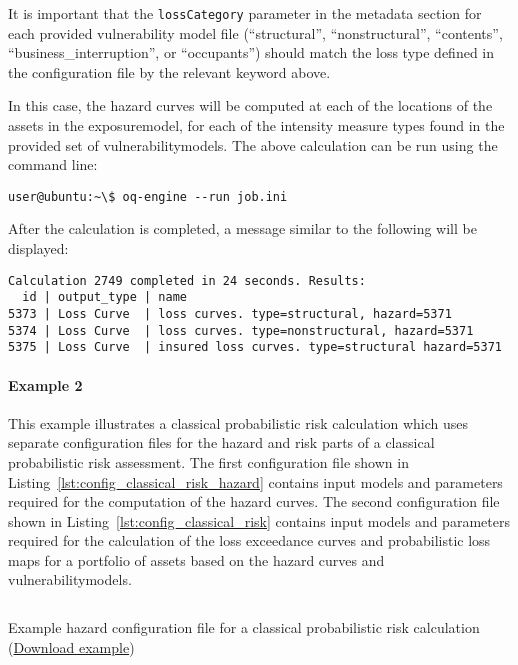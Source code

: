 It is important that the
\Verb+lossCategory+ parameter in the metadata section for each provided
vulnerability model file (``structural'', ``nonstructural'', ``contents'',
``business\_interruption'', or ``occupants'') should match the loss type
defined in the configuration file by the relevant keyword above.

In this case, the hazard curves will be computed at each of the locations of
the \glspl{asset} in the \gls{exposuremodel}, for each of the intensity
measure types found in the provided set of \glspl{vulnerabilitymodel}. The
above calculation can be run using the command line:

\begin{verbatim}
user@ubuntu:~\$ oq-engine --run job.ini
\end{verbatim}

After the calculation is completed, a message similar to the following will be
displayed:

\begin{verbatim}
Calculation 2749 completed in 24 seconds. Results:
  id | output_type | name
5373 | Loss Curve  | loss curves. type=structural, hazard=5371
5374 | Loss Curve  | loss curves. type=nonstructural, hazard=5371
5375 | Loss Curve  | insured loss curves. type=structural hazard=5371
\end{verbatim}


\paragraph{Example 2}

This example illustrates a classical probabilistic risk calculation which uses
separate configuration files for the hazard and risk parts of a classical
probabilistic risk assessment. The first configuration file shown in
Listing~\ref{lst:config_classical_risk_hazard} contains input models and
parameters required for the computation of the hazard curves. The second
configuration file shown in Listing~\ref{lst:config_classical_risk} contains
input models and parameters required for the calculation of the loss
exceedance curves and probabilistic loss maps for a portfolio of \glspl{asset}
based on the hazard curves and \glspl{vulnerabilitymodel}.

\begin{listing}[htbp]
  \inputminted[firstline=1,firstnumber=1,fontsize=\footnotesize,frame=single,linenos,bgcolor=lightgray,label=job\_hazard.ini]{ini}{oqum/risk/verbatim/config_classical_hazard.ini}
  \caption{Example hazard configuration file for a classical probabilistic risk calculation (\href{https://raw.githubusercontent.com/GEMScienceTools/oq-engine-docs/master/oqum/risk/verbatim/config_classical_hazard.xml}{Download example})}
  \label{lst:config_classical_risk_hazard}
\end{listing}

